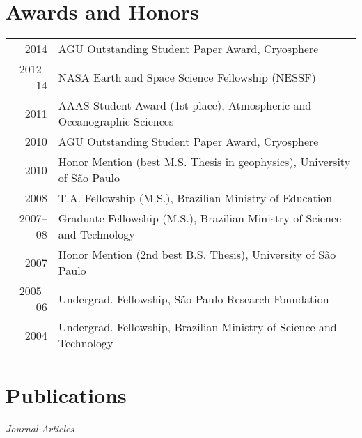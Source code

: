 \documentclass[a4paper,11pt]{article}
\begin{document}

\section{Awards and Honors}

\begin{tabular}{rl}
2014 & AGU Outstanding Student Paper Award, Cryosphere\\
2012--14 & NASA Earth and Space Science Fellowship (NESSF)\\ 
2011 & AAAS Student Award (1st place), Atmospheric and Oceanographic Sciences\\
2010 & AGU Outstanding Student Paper Award, Cryosphere\\
2010 & Honor Mention (best M.S. Thesis in geophysics), University of S\~ao Paulo\\
2008 & T.A. Fellowship (M.S.), Brazilian Ministry of Education\\
2007--08 & Graduate Fellowship (M.S.), Brazilian Ministry of Science and Technology\\
2007 & Honor Mention (2nd best B.S. Thesis), University of S\~ao Paulo\\
2005--06 & Undergrad. Fellowship, S\~ao Paulo Research Foundation\\
2004 & Undergrad. Fellowship, Brazilian Ministry of Science and Technology
\end{tabular}


\section{Publications}

\emph{Journal Articles}
\end{document}
